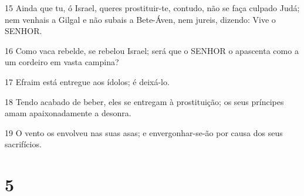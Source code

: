 \par 15 Ainda que tu, ó Israel, queres prostituir-te, contudo, não se faça culpado Judá; nem venhais a Gilgal e não subais a Bete-Áven, nem jureis, dizendo: Vive o SENHOR.
\par 16 Como vaca rebelde, se rebelou Israel; será que o SENHOR o apascenta como a um cordeiro em vasta campina?
\par 17 Efraim está entregue aos ídolos; é deixá-lo.
\par 18 Tendo acabado de beber, eles se entregam à prostituição; os seus príncipes amam apaixonadamente a desonra.
\par 19 O vento os envolveu nas suas asas; e envergonhar-se-ão por causa dos seus sacrifícios.

\chapter{5}

